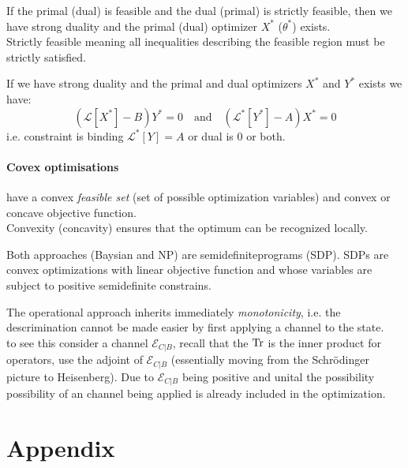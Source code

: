 \begin{proposition}
If the primal (dual) is feasible and the dual (primal) is strictly feasible, then we have strong duality and the
primal (dual) optimizer $X^*$ ($\theta^*$) exists.\\
Strictly feasible meaning all inequalities describing the feasible region must be strictly satisfied.
\end{proposition}

\begin{proposition}
  If we have strong duality and the primal and dual optimizers $X^*$ and $Y^*$ exists we have: 
  $$(\mathcal{L}[X^*]-B) Y^*=0 \quad \text{and} \quad \left(\mathcal{L}^*[Y^*]-A\right) X^*=0$$
  i.e. constraint is binding $\mathcal{L}^*[Y]=A$ or dual is $0$ or both.
\end{proposition}

\paragraph{Covex optimisations} have a convex \emph{feasible set} (set of possible optimization variables) and convex or concave objective function.\\
Convexity (concavity) ensures that the optimum can be recognized locally. 

\begin{remark}
  Both approaches (Baysian and NP) are semidefiniteprograms (SDP). SDPs are convex optimizations with linear objective function and whose variables are 
  subject to positive semidefinite constrains. \\  
\end{remark}

\begin{remark}
  The operational approach inherits immediately \emph{monotonicity}, i.e. the descrimination cannot be made easier by first applying a channel to the state.\\
  to see this consider a channel $\mathcal{E}_{C|B}$, recall that the $\Tr$ is the inner product for operators, use the adjoint of $\mathcal{E}_{C|B}$
  (essentially moving from the Schrödinger picture to Heisenberg). Due to $\mathcal{E}_{C|B}$ being positive and unital the possibility
  possibility of an channel being applied is already included in the optimization. 
\end{remark}


\section{Appendix}

